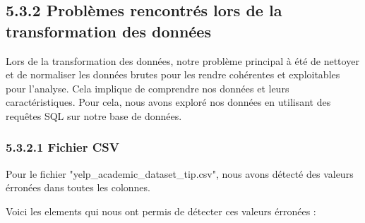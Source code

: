 \subsection{5.3.2 Problèmes rencontrés lors de la transformation des données}

Lors de la transformation des données, notre problème principal à été de nettoyer et de normaliser les données brutes pour les rendre cohérentes et exploitables pour l’analyse.
Cela implique de comprendre nos données et leurs caractéristiques.
Pour cela, nous avons exploré nos données en utilisant des requêtes SQL sur notre base de données.

\subsubsection{5.3.2.1 Fichier CSV}

Pour le fichier "yelp_academic_dataset_tip.csv", nous avons détecté des valeurs érronées dans toutes les colonnes.

Voici les elements qui nous ont permis de détecter ces valeurs érronées :

